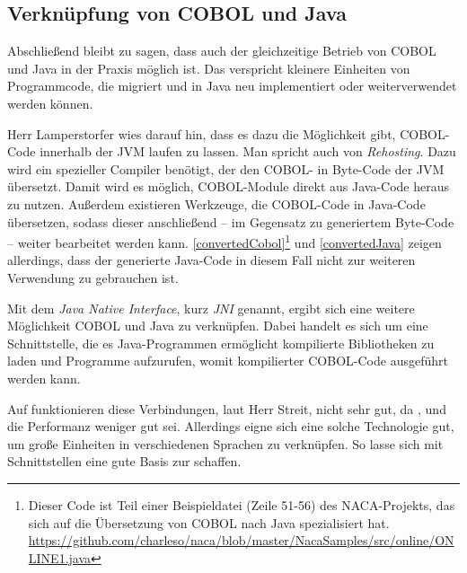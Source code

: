 \subsection*{Verknüpfung von COBOL und Java} 

Abschließend bleibt zu sagen, dass auch der gleichzeitige Betrieb von COBOL und Java in der Praxis möglich ist. Das verspricht kleinere Einheiten von Programmcode, die migriert und in Java neu implementiert oder weiterverwendet werden können.


Herr Lamperstorfer wies darauf hin, dass es dazu die Möglichkeit gibt, COBOL-Code innerhalb der JVM laufen zu lassen. Man spricht auch von \textit{Rehosting}. Dazu wird ein spezieller Compiler benötigt, der den COBOL- in Byte-Code der JVM übersetzt. Damit wird es möglich, COBOL-Module direkt aus Java-Code heraus zu nutzen. Außerdem existieren Werkzeuge, die COBOL-Code in Java-Code übersetzen, sodass dieser anschließend -- im Gegensatz zu generiertem Byte-Code -- weiter bearbeitet werden kann. \autoref{convertedCobol}\footnote{ Dieser Code ist Teil einer Beispieldatei (Zeile 51-56) des NACA-Projekts, das sich auf die Übersetzung von COBOL nach Java spezialisiert hat.\\\url{https://github.com/charleso/naca/blob/master/NacaSamples/src/online/ONLINE1.java} \visitedOn} und \autoref{convertedJava} zeigen allerdings, dass der generierte Java-Code in diesem Fall nicht zur weiteren Verwendung zu gebrauchen ist.

Mit dem \textit{Java Native Interface}, kurz \textit{JNI} genannt, ergibt sich eine weitere Möglichkeit COBOL und Java zu verknüpfen. Dabei handelt es sich um eine Schnittstelle, die es Java-Programmen ermöglicht kompilierte Bibliotheken zu laden und Programme aufzurufen, womit kompilierter COBOL-Code ausgeführt werden kann.

Auf  funktionieren diese Verbindungen, laut Herr Streit, nicht sehr gut, da ,  und die Performanz weniger gut sei. Allerdings eigne sich eine solche Technologie gut, um große Einheiten in verschiedenen Sprachen zu verknüpfen. So lasse sich mit  Schnittstellen eine gute Basis zur  schaffen.